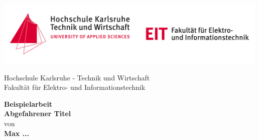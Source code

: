 


\pagestyle{empty}
\begin{titlepage}
	\includegraphics[width=1\textwidth]{figures/hska-eit-header-logo.pdf}
	
	\vspace{1cm}	
	
	\begin{center}
		\Large{Hochschule Karlsruhe - Technik und Wirtschaft}\\
		\Large{Fakultät für Elektro- und Informationstechnik}
	\end{center}
	
	\vspace{1cm}
	
	\begin{center}
		\textbf{\huge{Beispielarbeit}}\\
		\vspace{0.5cm}
		\textbf{\LARGE{Abgefahrener Titel}}\\
		\vspace{1cm}
		\large{von}\\
		\textbf{\large{Max ...}}\\
	\end{center}
\end{titlepage}
\newpage

\tableofcontents
\newpage

\pagestyle{headings}


\clearpage

